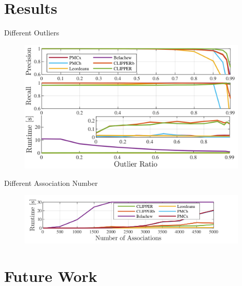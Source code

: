 \documentclass{beamer}
\begin{document}
\section{Results}
\begin{frame}
  \sectionpage
\end{frame}


\begin{frame}{Different Outliers}
  \begin{figure}
    \includegraphics[width=11cm]{images/results-all.png}
  \end{figure}
\end{frame}

\begin{frame}{Different Association Number}
  \begin{figure}
    \includegraphics[width=11cm]{images/results-runtime-assoc.png}
  \end{figure}

\end{frame}

\section{Future Work}
\begin{frame}
  \sectionpage
\end{frame}
\end{document}
